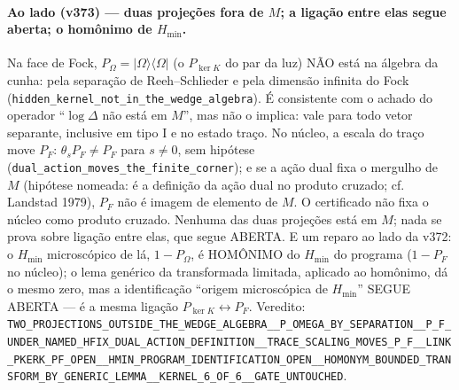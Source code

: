 \documentclass[11pt]{article}
\theoremstyle{definition}\newtheorem{deriv}{Derivação}
\begin{document}
\paragraph*{Ao lado (v373) --- duas projeções fora de $M$; a ligação entre elas segue aberta; o homônimo de $H_{\min}$.} Na face de Fock, $P_\Omega=|\Omega\rangle\langle\Omega|$ (o $P_{\ker K}$ do par da luz) NÃO está na álgebra da cunha: pela separação de Reeh--Schlieder e pela dimensão infinita do Fock (\texttt{hidden\_kernel\_not\_in\_the\_wedge\_algebra}). É consistente com o achado do operador ``$\log\Delta$ não está em $M$'', mas não o implica: vale para todo vetor separante, inclusive em tipo I e no estado traço. No núcleo, a escala do traço move $P_F$: $\theta_s P_F\neq P_F$ para $s\neq 0$, sem hipótese (\texttt{dual\_action\_moves\_the\_finite\_corner}); e se a ação dual fixa o mergulho de $M$ (hipótese nomeada: é a definição da ação dual no produto cruzado; cf. Landstad 1979), $P_F$ não é imagem de elemento de $M$. O certificado não fixa o núcleo como produto cruzado. Nenhuma das duas projeções está em $M$; nada se prova sobre ligação entre elas, que segue ABERTA. E um reparo ao lado da v372: o $H_{\min}$ microscópico de lá, $1-P_\Omega$, é HOMÔNIMO do $H_{\min}$ do programa ($1-P_F$ no núcleo); o lema genérico da transformada limitada, aplicado ao homônimo, dá o mesmo zero, mas a identificação ``origem microscópica de $H_{\min}$'' SEGUE ABERTA --- é a mesma ligação $P_{\ker K}\leftrightarrow P_F$. Veredito: \texttt{TWO\_PROJECTIONS\_OUTSIDE\_THE\_WEDGE\_ALGEBRA\_\_P\_OMEGA\_BY\_SEPARATION\_\_P\_F\_UNDER\_NAMED\_HFIX\_DUAL\_ACTION\_DEFINITION\_\_TRACE\_SCALING\_MOVES\_P\_F\_\_LINK\_PKERK\_PF\_OPEN\_\_HMIN\_PROGRAM\_IDENTIFICATION\_OPEN\_\_HOMONYM\_BOUNDED\_TRANSFORM\_BY\_GENERIC\_LEMMA\_\_KERNEL\_6\_OF\_6\_\_GATE\_UNTOUCHED}.
\end{document}
